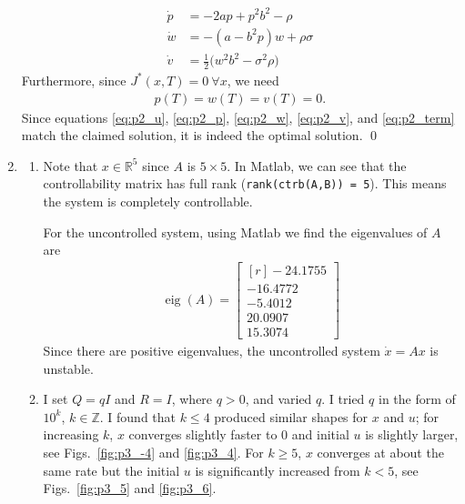 \documentclass[letterpaper,11pt,titlepage]{article}
\DeclareMathOperator{\eig}{eig}
\newcommand*\R{\mathbb{R}}
\begin{document}
\begin{enumerate}[leftmargin=0pt]
\begin{align}
            \dot p &= -2ap + p^2b^2 - \rho \label{eq:p2_p} \\
            \dot w &= -(a-b^2p)w + \rho\sigma \label{eq:p2_w} \\
            \dot v &= \frac12 \big( w^2b^2 - \sigma^2\rho \big) \label{eq:p2_v}
        \end{align}
        Furthermore, since $J^*(x,T)=0\ \forall x$, we need 
        \begin{gather}
            p(T)=w(T)=v(T)=0. \label{eq:p2_term}
        \end{gather}
        Since equations \eqref{eq:p2_u}, \eqref{eq:p2_p}, \eqref{eq:p2_w}, \eqref{eq:p2_v}, and \eqref{eq:p2_term} match the claimed solution, it is indeed the optimal solution. \qed

    \item 
        \begin{enumerate}
            \item Note that $x\in\R^5$ since $A$ is $5\times 5$. In Matlab, we can see that the controllability matrix has full rank (\texttt{rank(ctrb(A,B)) = 5}). This means the system is completely controllable.

                For the uncontrolled system, using Matlab we find the eigenvalues of $A$ are
                    \begin{gather}
                        \eig(A) = 
                        \begin{bmatrix*}[r]
                            -24.1755 \\
                            -16.4772 \\
                            -5.4012 \\
                            20.0907 \\
                            15.3074
                        \end{bmatrix*}
                    \end{gather}
                    Since there are positive eigenvalues, the uncontrolled system $\dot x=Ax$ is unstable.
                \item I set $Q=qI$ and $R=I$, where $q>0$, and varied $q$. I tried $q$ in the form of $10^{k}$, $k\in\mathbb Z$. I found that $k\le 4$ produced similar shapes for $x$ and $u$; for increasing $k$, $x$ converges slightly faster to 0 and initial $u$ is slightly larger, see Figs.~\ref{fig:p3_-4} and \ref{fig:p3_4}. For $k\ge 5$, $x$ converges at about the same rate but the initial $u$ is significantly increased from $k<5$, see Figs.~\ref{fig:p3_5} and \ref{fig:p3_6}.


\end{enumerate}
\end{enumerate}
\end{document}
